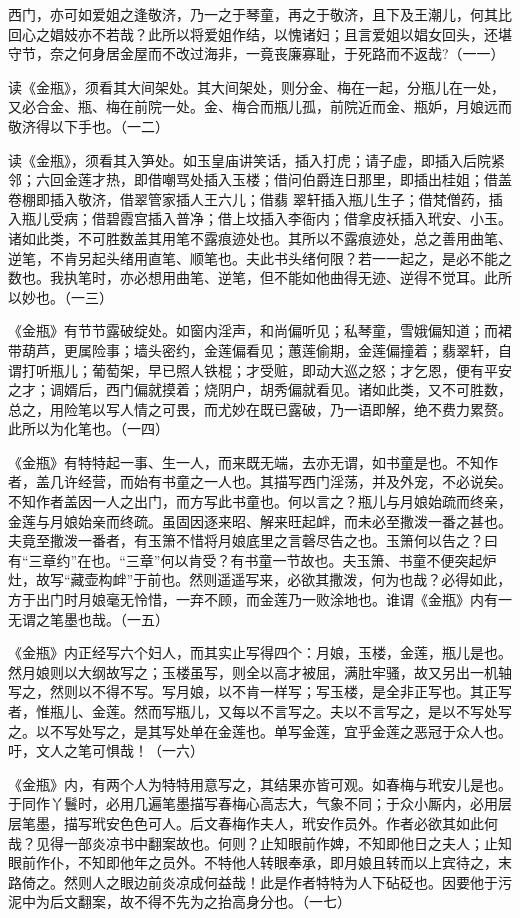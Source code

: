 \begin{showcontents}{}
{西门，亦可如爱姐之逢敬济，乃一之于琴童，再之于敬济，且下及王潮儿，何其比回心之娼妓亦不若哉？此所以将爱姐作结，以愧诸妇；且言爱姐以娼女回头，还堪守节，奈之何身居金屋而不改过海非，一竟丧廉寡耻，于死路而不返哉?（一一）

读《金瓶》，须看其大间架处。其大间架处，则分金、梅在一起，分瓶儿在一处，又必合金、瓶、梅在前院一处。金、梅合而瓶儿孤，前院近而金、瓶妒，月娘远而敬济得以下手也。（一二）

读《金瓶》，须看其入笋处。如玉皇庙讲笑话，插入打虎；请子虚，即插入后院紧邻；六回金莲才热，即借嘲骂处插入玉楼；借问伯爵连日那里，即插出桂姐；借盖卷棚即插入敬济，借翠管家插人王六儿；借翡
翠轩插入瓶儿生子；借梵僧药，插入瓶儿受病；借碧霞宫插入普净；借上坟插入李衙内；借拿皮袄插入玳安、小玉。诸如此类，不可胜数盖其用笔不露痕迹处也。其所以不露痕迹处，总之善用曲笔、逆笔，不肯另起头绪用直笔、顺笔也。夫此书头绪何限？若一一起之，是必不能之数也。我执笔时，亦必想用曲笔、逆笔，但不能如他曲得无迹、逆得不觉耳。此所以妙也。（一三）

《金瓶》有节节露破绽处。如窗内淫声，和尚偏听见；私琴童，雪娥偏知道；而裙带葫芦，更属险事；墙头密约，金莲偏看见；蕙莲偷期，金莲偏撞着；翡翠轩，自谓打听瓶儿；葡萄架，早已照人铁棍；才受赃，即动大巡之怒；才乞恩，便有平安之才；调婿后，西门偏就摸着；烧阴户，胡秀偏就看见。诸如此类，又不可胜数，总之，用险笔以写人情之可畏，而尤妙在既已露破，乃一语即解，绝不费力累赘。此所以为化笔也。（一四）

《金瓶》有特特起一事、生一人，而来既无端，去亦无谓，如书童是也。不知作者，盖几许经营，而始有书童之一人也。其描写西门淫荡，并及外宠，不必说矣。不知作者盖因一人之出门，而方写此书童也。何以言之？瓶儿与月娘始疏而终亲，金莲与月娘始亲而终疏。虽固因逐来昭、解来旺起衅，而未必至撒泼一番之甚也。夫竟至撒泼一番者，有玉箫不惜将月娘底里之言磬尽告之也。玉箫何以告之？曰有“三章约”在也。“三章”何以肯受？有书童一节故也。夫玉箫、书童不便突起炉灶，故写“藏壶构衅”于前也。然则遥遥写来，必欲其撒泼，何为也哉？必得如此，方于出门时月娘毫无怜惜，一弃不顾，而金莲乃一败涂地也。谁谓《金瓶》内有一无谓之笔墨也哉。（一五）

《金瓶》内正经写六个妇人，而其实止写得四个：月娘，玉楼，金莲，瓶儿是也。然月娘则以大纲故写之；玉楼虽写，则全以高才被屈，满肚牢骚，故又另出一机轴写之，然则以不得不写。写月娘，以不肯一样写；写玉楼，是全非正写也。其正写者，惟瓶儿、金莲。然而写瓶儿，又每以不言写之。夫以不言写之，是以不写处写之。以不写处写之，是其写处单在金莲也。单写金莲，宜乎金莲之恶冠于众人也。吁，文人之笔可惧哉！（一六）

《金瓶》内，有两个人为特特用意写之，其结果亦皆可观。如春梅与玳安儿是也。于同作丫鬟时，必用几遍笔墨描写春梅心高志大，气象不同；于众小厮内，必用层层笔墨，描写玳安色色可人。后文春梅作夫人，玳安作员外。作者必欲其如此何哉？见得一部炎凉书中翻案故也。何则？止知眼前作婢，不知即他日之夫人；止知眼前作仆，不知即他年之员外。不特他人转眼奉承，即月娘且转而以上宾待之，末路倚之。然则人之眼边前炎凉成何益哉！此是作者特特为人下砧砭也。因要他于污泥中为后文翻案，故不得不先为之抬高身分也。（一七）

}
\end{showcontents}
